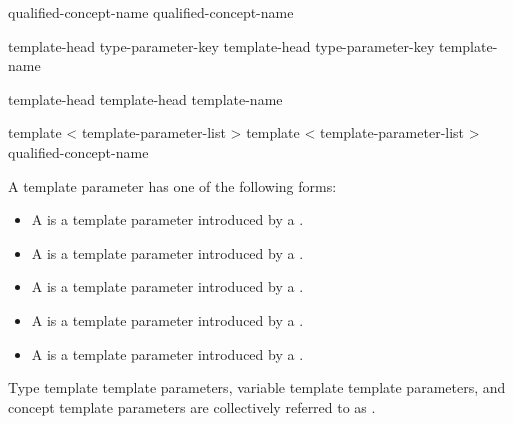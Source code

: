 \documentclass{wg21}
\begin{document}
\begin{bnf}
    \br
    \br
\end{bnf}

\begin{bnf}
    \br
    qualified-concept-name \br
    qualified-concept-name \terminal{<}  \terminal{>}
\end{bnf}

\begin{addedblock}

\begin{bnf}
\br
template-head type-parameter-key  \br
template-head type-parameter-key  \terminal{=}  template-name
\end{bnf}

\begin{bnf}
    \br
    template-head   \br
    template-head   \terminal{=}  template-name
\end{bnf}

\begin{bnf}
    \br
    template < template-parameter-list >   \br
    template < template-parameter-list >   \terminal{=} qualified-concept-name
\end{bnf}

A template parameter has one of the following forms:
\begin{itemize}
\item A  is a template parameter introduced by a .
\item A  is a template parameter introduced by a .
\item A  is a template parameter introduced by a .
\item A  is a template parameter introduced by a .
\item A  is a template parameter introduced by a .
\end{itemize}
Type template template parameters, variable template template parameters, and concept template parameters are collectively referred to as .

\end{addedblock}
\end{document}
